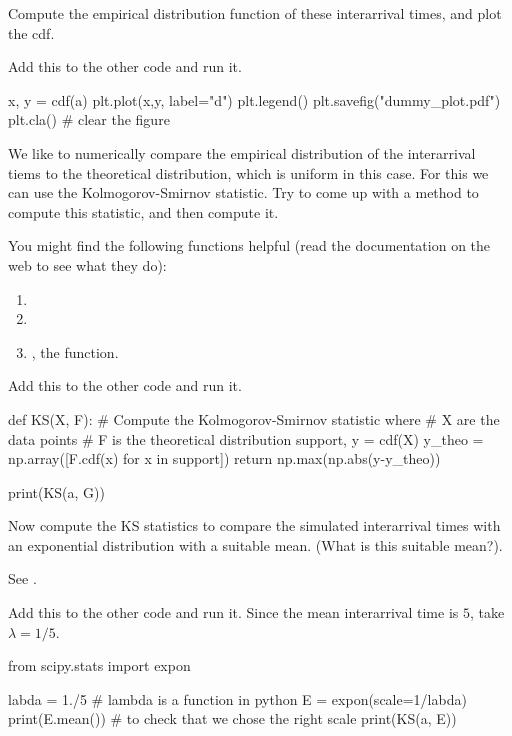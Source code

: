 \documentclass{scrartcl}
\begin{document}
\begin{exercise}
Compute  the empirical distribution function of these interarrival times, and plot the cdf.
\begin{solution}
Add this to the other code and run it.
\begin{pyverbatim}
x, y = cdf(a)
plt.plot(x,y,  label="d")
plt.legend()
plt.savefig("dummy_plot.pdf")
plt.cla() # clear the figure
\end{pyverbatim}
\end{solution}
\end{exercise}

\begin{exercise}
  We like to numerically compare the empirical distribution of the interarrival tiems to the theoretical distribution, which is uniform in this case. 
For this we can use the Kolmogorov-Smirnov statistic. Try to come up with a method to compute this statistic, and then compute it. 

You might find the following functions helpful (read the documentation on the web to see what they do):
\begin{enumerate}
\item {}
\item {}
\item {}, the  function.
\end{enumerate}

\begin{solution}
Add this to the other code and run it.
\begin{pyverbatim}
def KS(X, F):
    # Compute the Kolmogorov-Smirnov statistic where
    # X are the data points
    # F is the theoretical distribution
    support, y = cdf(X)
    y_theo = np.array([F.cdf(x) for x in support])
    return np.max(np.abs(y-y_theo))

print(KS(a, G))    
\end{pyverbatim}
\end{solution}
\end{exercise}

\begin{exercise}
  Now compute the KS statistics to compare the simulated interarrival times with an exponential distribution with a suitable mean. (What is this suitable mean?).

See .


\begin{solution}
Add this to the other code and run it. Since the mean interarrival time is $5$, take $\lambda = 1/5$.

\begin{pyverbatim}
from scipy.stats import expon

labda = 1./5 # lambda is a function in python
E = expon(scale=1/labda) 
print(E.mean()) # to check that we chose the right scale
print(KS(a, E))    
\end{pyverbatim}
\end{solution}
\end{exercise}
\end{document}
